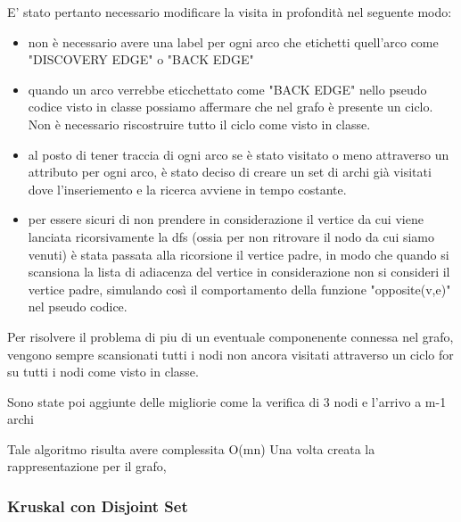 E' stato pertanto necessario modificare la visita in profondità nel seguente modo:
\begin{itemize}
	\item non è necessario avere una label per ogni arco che etichetti quell'arco come "DISCOVERY EDGE" o "BACK EDGE"
	\item quando un arco verrebbe eticchettato come "BACK EDGE" nello pseudo codice visto in classe possiamo affermare che nel grafo è presente un ciclo. Non è necessario riscostruire tutto il ciclo come visto in classe.
	\item al posto di tener traccia di ogni arco se è stato visitato o meno attraverso un attributo per ogni arco, è stato deciso di creare un set di archi già visitati dove l'inseriemento e la ricerca avviene in tempo costante.
	\item per essere sicuri di non prendere in considerazione il vertice da cui viene lanciata ricorsivamente la dfs (ossia per non ritrovare il nodo da cui siamo venuti) è stata passata alla ricorsione il vertice padre, in modo che quando si scansiona la lista di adiacenza del vertice in considerazione non si consideri il vertice padre, simulando così il comportamento della funzione "opposite(v,e)" nel pseudo codice.
\end{itemize}


Per risolvere il problema di piu di un eventuale componenente connessa nel grafo, vengono sempre scansionati tutti i nodi non ancora visitati attraverso un ciclo for su tutti i nodi come visto in classe.

Sono state poi aggiunte delle migliorie come la verifica di 3 nodi e l'arrivo a m-1 archi

Tale algoritmo risulta avere complessita O(mn)
Una volta creata la rappresentazione per il grafo,



\subsubsection{Kruskal con Disjoint Set}

